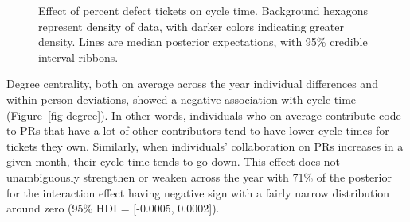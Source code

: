 \documentclass[manuscript,screen,review]{acmart}
\begin{document}
\begin{figure}


\caption[Defect tickets effect on cycle
time]{\label{fig-defecttickets}Effect of percent defect tickets on cycle
time. Background hexagons represent density of data, with darker colors
indicating greater density. Lines are median posterior expectations,
with 95\% credible interval ribbons.}

\end{figure}%

Degree centrality, both on average across the year individual
differences and within-person deviations, showed a negative association
with cycle time (Figure~\ref{fig-degree}). In other words, individuals
who on average contribute code to PRs that have a lot of other
contributors tend to have lower cycle times for tickets they own.
Similarly, when individuals' collaboration on PRs increases in a given
month, their cycle time tends to go down. This effect does not
unambiguously strengthen or weaken across the year with 71\% of the
posterior for the interaction effect having negative sign with a fairly
narrow distribution around zero (95\% HDI = {[}-0.0005, 0.0002{]}).
\end{document}
